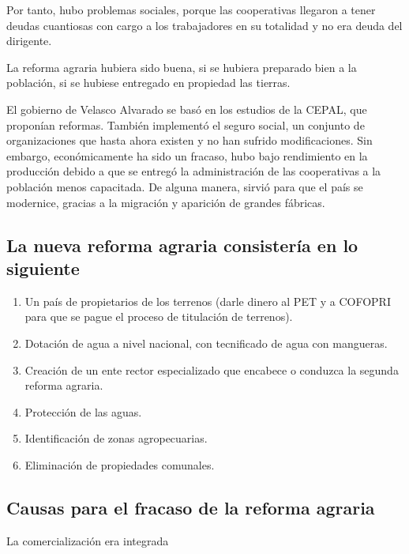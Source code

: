 \documentclass[
  letterpaper,
  DIV=11,
  numbers=noendperiod]{scrartcl}
\begin{document}
Por tanto, hubo problemas sociales, porque las cooperativas llegaron a
tener deudas cuantiosas con cargo a los trabajadores en su totalidad y
no era deuda del dirigente.

La reforma agraria hubiera sido buena, si se hubiera preparado bien a la
población, si se hubiese entregado en propiedad las tierras.

El gobierno de Velasco Alvarado se basó en los estudios de la CEPAL, que
proponían reformas. También implementó el seguro social, un conjunto de
organizaciones que hasta ahora existen y no han sufrido modificaciones.
Sin embargo, económicamente ha sido un fracaso, hubo bajo rendimiento en
la producción debido a que se entregó la administración de las
cooperativas a la población menos capacitada. De alguna manera, sirvió
para que el país se modernice, gracias a la migración y aparición de
grandes fábricas.

\hypertarget{la-nueva-reforma-agraria-consisteruxeda-en-lo-siguiente}{%
\subsection{La nueva reforma agraria consistería en lo
siguiente}\label{la-nueva-reforma-agraria-consisteruxeda-en-lo-siguiente}}

\begin{enumerate}
\def\labelenumi{\arabic{enumi}.}
\item
  Un país de propietarios de los terrenos (darle dinero al PET y a
  COFOPRI para que se pague el proceso de titulación de terrenos).
\item
  Dotación de agua a nivel nacional, con tecnificado de agua con
  mangueras.
\item
  Creación de un ente rector especializado que encabece o conduzca la
  segunda reforma agraria.
\item
  Protección de las aguas.
\item
  Identificación de zonas agropecuarias.
\item
  Eliminación de propiedades comunales.
\end{enumerate}

\hypertarget{causas-para-el-fracaso-de-la-reforma-agraria}{%
\subsection{Causas para el fracaso de la reforma
agraria}\label{causas-para-el-fracaso-de-la-reforma-agraria}}

La comercialización era integrada
\end{document}
